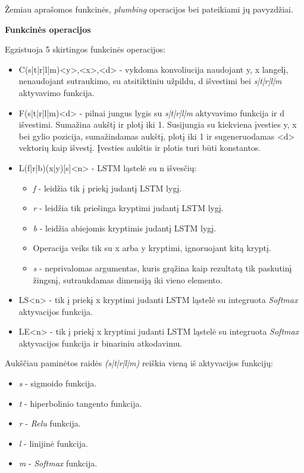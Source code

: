 \documentclass{VUMIFInfBakalaurinis}
\begin{document}
Žemiau aprašomos funkcinės, \textit{plumbing} operacijos bei pateikiami jų pavyzdžiai.

\textbf{Funkcinės operacijos}

Egzistuoja 5 skirtingos funkcinės operacijos:

\begin{itemize}[itemsep=0.5pt]
  \item C(s|t|r|l|m)<y>,<x>,<d> - vykdoma konvoliucija naudojant y, x langelį, nenaudojant sutraukimo, su atsitiktiniu užpildu, d išvestimi bei \textit{s|t|r|l|m} aktyvavimo funkcija.
  \item F(s|t|r|l|m)<d> - pilnai jungus lygis su \textit{s|t|r|l|m} aktyvavimo funkcija ir d išvestimi.
  Sumažina aukštį ir plotį iki 1. Susijungia su kiekviena įvesties y, x bei gylio pozicija, sumažindamas aukštį, plotį iki 1 ir sugeneruodamas <d> vektorių kaip išvestį.
  Įvesties aukštis ir plotis turi būti konstantos.
  \item L(f|r|b)(x|y)[s]<n> - LSTM ląstelė su n išvesčių:
  \begin{itemize}[itemsep=0.5pt]
    \item \textit{f} - leidžia tik į priekį judantį LSTM lygį.
    \item \textit{r} - leidžia tik priešinga kryptimi judantį LSTM lygį.
    \item \textit{b} - leidžia abiejomis kryptimis judantį LSTM lygį.
    \item Operacija veiks tik su x arba y kryptimi, ignoruojant kitą kryptį.
    \item \textit{s} - neprivalomas argumentas, kuris grąžina kaip rezultatą tik paskutinį žingsnį, sutraukdamas dimensiją iki vieno elemento.
  \end{itemize}
  \item LS<n> - tik į priekį x kryptimi judanti LSTM ląstelė su integruota \textit{Softmax} aktyvacijos funkcija.
  \item LE<n> - tik į priekį x kryptimi judanti LSTM ląstelė su integruota \textit{Softmax} aktyvacijos funkcija ir binariniu atkodavimu.
\end{itemize}

Aukščiau paminėtos raidės \textit{(s|t|r|l|m)} reiškia vieną iš aktyvacijos funkcijų:

\begin{itemize}[itemsep=0.5pt]
  \item \textit{s} - sigmoido funkcija.
  \item \textit{t} - hiperbolinio tangento funkcija.
  \item \textit{r} - \textit{Relu} funkcija.
  \item \textit{l} - linijinė funkcija.
  \item \textit{m} - \textit{Softmax} funkcija.
\end{itemize}
\end{document}
